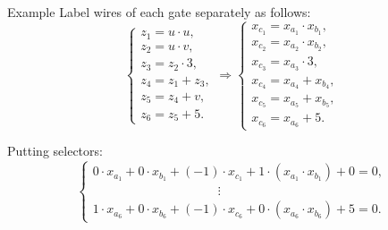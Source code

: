 \documentclass{beamer}
\begin{document}
	\begin{frame}{Example}
		Label wires of each gate separately as follows:
		\begin{equation*}
			\begin{cases}
				z_1 = u \cdot u,\\
				z_2 = u \cdot v,\\
				z_3 = z_2 \cdot 3,\\
				z_4 = z_1 + z_3,\\
				z_5 = z_4 + v,\\
				z_6 = z_5 + 5.
			\end{cases}
			\Rightarrow
			\begin{cases}
				x_{c_1} = x_{a_1} \cdot x_{b_1},\\
				x_{c_2} = x_{a_2} \cdot x_{b_2},\\
				x_{c_3} = x_{a_3} \cdot 3,\\
				x_{c_4} = x_{a_4} + x_{b_4},\\
				x_{c_5} = x_{a_5} + x_{b_5},\\
				x_{c_6} = x_{a_6} + 5.
			\end{cases}
		\end{equation*}
	
		Putting selectors:
		\begin{equation*}
			\begin{cases}
				0 \cdot x_{a_1} + 0 \cdot x_{b_1} + (-1) \cdot x_{c_1} + 1 \cdot (x_{a_1}\cdot x_{b_1}) + 0 = 0,\\
				\qquad\qquad\qquad\qquad\qquad\vdots \\
				1 \cdot x_{a_6} + 0 \cdot x_{b_6} + (-1) \cdot x_{c_6} + 0 \cdot (x_{a_6}\cdot x_{b_6}) + 5 = 0.
			\end{cases}
		\end{equation*}
	\end{frame}
\end{document}
